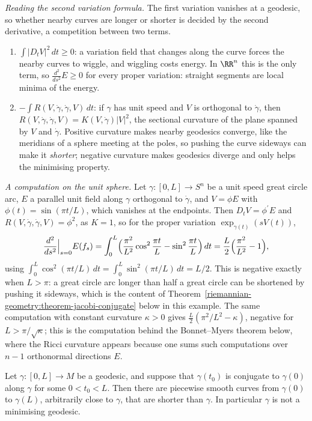 \begin{remark}\label{riemannian-geometry:remark-reading-second-variation}
\emph{Reading the second variation formula.} The first variation vanishes at a geodesic, so whether nearby curves are longer or shorter is decided by the second derivative, a
competition between two terms.
\begin{enumerate}
\item $\int|D_tV|^2\,dt \geq 0$: a variation field that changes along the curve forces the nearby curves to wiggle, and wiggling costs energy. In $\RR^n$ this is the only term, so
$\frac{d^2}{ds^2}E \geq 0$ for every proper variation: straight segments are local minima of the energy.
\item $-\int R(V, \dot\gamma, \dot\gamma, V)\,dt$: if $\gamma$ has unit speed and $V$ is orthogonal to $\dot\gamma$, then $R(V, \dot\gamma, \dot\gamma, V) = K(V, \dot\gamma)|V|^2$, the sectional
curvature of the plane spanned by $V$ and $\dot\gamma$. Positive curvature makes nearby geodesics converge, like the meridians of a sphere meeting at the poles, so pushing the curve
sideways can make it \emph{shorter}; negative curvature makes geodesics diverge and only helps the minimising property.
\end{enumerate}
\emph{A computation on the unit sphere.} Let $\gamma \colon [0, L] \to S^n$ be a unit speed great circle arc, $E$ a parallel unit field along $\gamma$ orthogonal to $\dot\gamma$, and
$V = \phi E$ with $\phi(t) = \sin(\pi t/L)$, which vanishes at the endpoints. Then $D_tV = \phi^{\prime}E$ and $R(V, \dot\gamma, \dot\gamma, V) = \phi^2$, as $K = 1$, so for the proper variation
$\exp_{\gamma(t)}(sV(t))$,
\[
\frac{d^2}{ds^2}\Big|_{s=0}E(f_s) = \int_0^L\Bigl(\frac{\pi^2}{L^2}\cos^2\frac{\pi t}{L} - \sin^2\frac{\pi t}{L}\Bigr)\,dt = \frac L2\Bigl(\frac{\pi^2}{L^2} - 1\Bigr),
\]
using $\int_0^L\cos^2(\pi t/L)\,dt = \int_0^L\sin^2(\pi t/L)\,dt = L/2$. This is negative exactly when $L > \pi$: a great circle arc longer than half a great circle can be shortened by pushing
it sideways, which is the content of Theorem~\ref{riemannian-geometry:theorem-jacobi-conjugate} below in this example. The same computation with constant curvature $\kappa > 0$ gives
$\frac L2(\pi^2/L^2 - \kappa)$, negative for $L > \pi/\sqrt\kappa$; this is the computation behind the Bonnet--Myers theorem below, where the Ricci curvature appears because one sums such
computations over $n - 1$ orthonormal directions $E$.
\end{remark}

\begin{theorem}[Jacobi]\label{riemannian-geometry:theorem-jacobi-conjugate}
Let $\gamma \colon [0, L] \to M$ be a geodesic, and suppose that $\gamma(t_0)$ is conjugate to $\gamma(0)$ along $\gamma$ for some $0 < t_0 < L$. Then there are piecewise
smooth curves from $\gamma(0)$ to $\gamma(L)$, arbitrarily close to $\gamma$, that are shorter than $\gamma$. In particular $\gamma$ is not a minimising geodesic.
\end{theorem}

